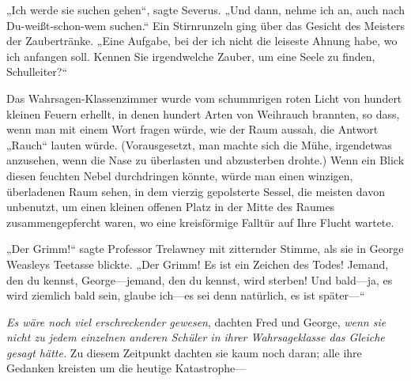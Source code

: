„Ich werde sie suchen gehen“, sagte Severus.
„Und dann, nehme ich an, auch nach Du-weißt-schon-wem suchen.“ Ein Stirnrunzeln ging über das Gesicht des Meisters der Zaubertränke.
„Eine Aufgabe, bei der ich nicht die leiseste Ahnung habe, wo ich anfangen soll. Kennen Sie irgendwelche Zauber, um eine Seele zu finden, Schulleiter?“

\later

Das Wahrsagen-Klassenzimmer wurde vom schummrigen roten Licht von hundert kleinen Feuern erhellt, in denen hundert Arten von Weihrauch brannten, so dass, wenn man mit einem Wort fragen würde, wie der Raum aussah, die Antwort
„Rauch“ lauten würde. (Vorausgesetzt, man machte sich die Mühe, irgendetwas anzusehen, wenn die Nase zu überlasten und abzusterben drohte.) Wenn ein Blick diesen feuchten Nebel durchdringen könnte, würde man einen winzigen, überladenen Raum sehen, in dem vierzig gepolsterte Sessel, die meisten davon unbenutzt, um einen kleinen offenen Platz in der Mitte des Raumes zusammengepfercht waren, wo eine kreisförmige Falltür auf Ihre Flucht wartete.

„Der Grimm!“ sagte Professor Trelawney mit zitternder Stimme, als sie in George Weasleys Teetasse blickte.
„Der Grimm! Es ist ein Zeichen des Todes! Jemand, den du kennst, George—jemand, den du kennst, wird sterben! Und bald—ja, es wird ziemlich bald sein, glaube ich—es sei denn natürlich, es ist später—“

\emph{Es wäre noch viel erschreckender gewesen}, dachten Fred und George, \emph{wenn sie nicht zu jedem einzelnen anderen Schüler in ihrer Wahrsageklasse das Gleiche gesagt hätte.}
Zu diesem Zeitpunkt dachten sie kaum noch daran; alle ihre Gedanken kreisten um die heutige Katastrophe—

